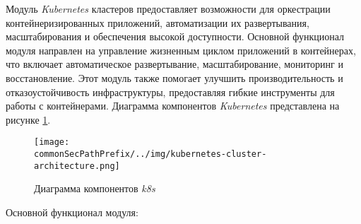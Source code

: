 Модуль \textit{Kubernetes} кластеров предоставляет возможности для оркестрации контейнеризированных приложений, автоматизации их развертывания, масштабирования и обеспечения высокой доступности. Основной функционал модуля направлен на управление жизненным циклом приложений в контейнерах, что включает автоматическое развертывание, масштабирование, мониторинг и восстановление. Этот модуль также помогает улучшить производительность и отказоустойчивость инфраструктуры, предоставляя гибкие инструменты для работы с контейнерами. Диаграмма компонентов \textit{Kubernetes} представлена на рисунке \ref{fig:kubernetes_cluster_functionality:k8s_components}.
\begin{figure}[ht]
    \centering
    \texttt{[image: \\commonSecPathPrefix/../img/kubernetes-cluster-architecture.png]}
    \caption{Диаграмма компонентов \textit{k8s}}
    \label{fig:kubernetes_cluster_functionality:k8s_components}
\end{figure}

Основной функционал модуля:


